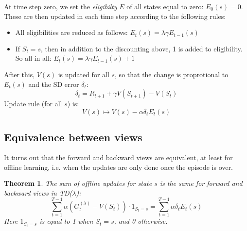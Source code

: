 \documentclass[12pt, a4paper]{article}
\newtheorem{theorem}{Theorem}[section]
\numberwithin{equation}{section}
\begin{document}
At time step zero, we set the \textit{eligibilty} $E$ of all states equal to zero: $E_0(s)=0$. These are then updated in each time step according to the following rules:
\begin{itemize}
\item All eligibilities are reduced as follows: $E_t(s)=\lambda\gamma E_{t-1}(s)$
\item If $S_t=s$, then in addition to the discounting above, 1 is added to eligibility. So all in all: $E_t(s)=\lambda\gamma E_{t-1}(s)+1$
\end{itemize}
After this, $V(s)$ is updated for all $s$, so that the change is proprotional to $E_t(s)$ and the SD error $\delta_t$:
\begin{equation}
\delta_t=R_{t+1}+\gamma V(S_{t+1})-V(S_t)
\label{delta_def}
\end{equation}
Update rule (for all $s$) is:
\begin{equation}
V(s)\mapsto V(s)-\alpha\delta_t E_t(s)
\end{equation}

\subsection{Equivalence between views}
It turns out that the forward and backward views are equivalent, at least for offline learning, i.e. when the updates are only done once the episode is over.

\begin{theorem}
The sum of offline updates for state $s$ is the same for forward and backward views in TD($\lambda$):
\begin{equation}
\sum_{t=1}^{T-1}\alpha\left(G^{(\lambda)}_t-V(S_t)\right)\cdot 1_{S_t=s}=\sum_{t=1}^{T-1}\alpha\delta_t E_t(s)
\end{equation}
Here $1_{S_t=s}$ is equal to 1 when $S_t=s$, and 0 otherwise.
\end{theorem}
\end{document}
